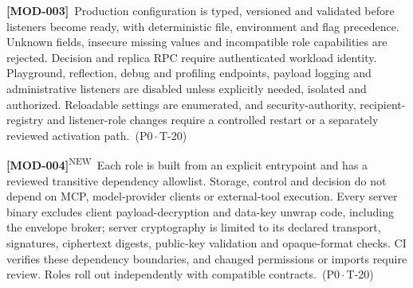 \documentclass[11pt,a4paper]{article}
\newcommand{\reqtag}[2]{{\footnotesize\color{accent}(#1\,$\cdot$\,#2)}}
\newcommand{\req}[4]{\par\noindent\hypertarget{req:#1}{\textbf{[#1]}}\ #4\ \reqtag{#2}{#3}\par}
\newcommand{\reqn}[4]{\par\noindent\hypertarget{req:#1}{\textbf{[#1]}}\textsuperscript{\color{accent}\tiny NEW}\ #4\ \reqtag{#2}{#3}\par}
\begin{document}
\req{MOD-003}{P0}{T-20}{Production configuration is typed, versioned and validated before listeners become ready, with deterministic file, environment and flag precedence. Unknown fields, insecure missing values and incompatible role capabilities are rejected. Decision and replica RPC require authenticated workload identity. Playground, reflection, debug and profiling endpoints, payload logging and administrative listeners are disabled unless explicitly needed, isolated and authorized. Reloadable settings are enumerated, and security-authority, recipient-registry and listener-role changes require a controlled restart or a separately reviewed activation path.}
\reqn{MOD-004}{P0}{T-20}{Each role is built from an explicit entrypoint and has a reviewed transitive dependency allowlist. Storage, control and decision do not depend on MCP, model-provider clients or external-tool execution. Every server binary excludes client payload-decryption and data-key unwrap code, including the envelope broker; server cryptography is limited to its declared transport, signatures, ciphertext digests, public-key validation and opaque-format checks. CI verifies these dependency boundaries, and changed permissions or imports require review. Roles roll out independently with compatible contracts.}
\end{document}
